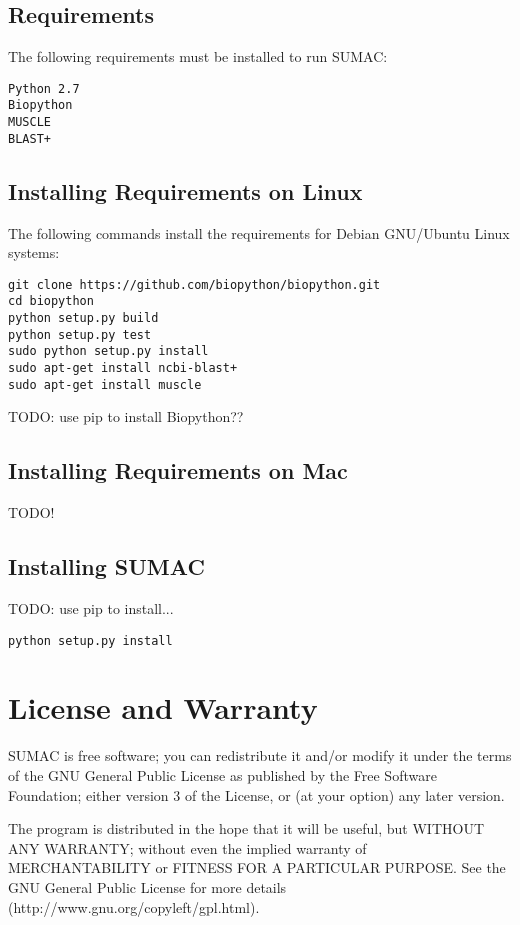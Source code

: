 \documentclass[12pt]{report}
\begin{document}
\subsection{Requirements}

The following requirements must be installed to run SUMAC:

\begin{verbatim}
Python 2.7
Biopython
MUSCLE
BLAST+
\end{verbatim}

\subsection{Installing Requirements on Linux}

The following commands install the requirements for Debian GNU/Ubuntu Linux systems:

\begin{verbatim}
git clone https://github.com/biopython/biopython.git
cd biopython
python setup.py build
python setup.py test
sudo python setup.py install
sudo apt-get install ncbi-blast+
sudo apt-get install muscle
\end{verbatim}

TODO: use pip to install Biopython??

\subsection{Installing Requirements on Mac}

TODO!

\subsection{Installing SUMAC}

TODO: use pip to install...

\begin{verbatim}
python setup.py install
\end{verbatim}

\section{License and Warranty}
SUMAC is free software; you can redistribute it and/or modify it under the terms of the GNU General Public License as published by the Free Software Foundation; either version 3 of the License, or (at your option) any later version.

The program is distributed in the hope that it will be useful, but WITHOUT ANY WARRANTY; without even the implied warranty of MERCHANTABILITY or FITNESS FOR A PARTICULAR PURPOSE. See the GNU General Public License for more details (http://www.gnu.org/copyleft/gpl.html).
\end{document}
